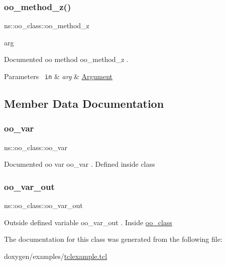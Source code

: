 \subsubsection{\texorpdfstring{oo\_method\_z()}{oo\_method\_z()}}
{\footnotesize\ttfamily ns\+::oo\+\_\+class\+::oo\+\_\+method\+\_\+z\begin{DoxyParamCaption}\item[{}]{arg  }\end{DoxyParamCaption}}

Documented oo method {\ttfamily oo\+\_\+method\+\_\+z} . 
\begin{DoxyParams}[1]{Parameters}
\mbox{\texttt{ in}}  & {\em arg} & \mbox{\hyperlink{struct_argument}{Argument}} \\
\hline
\end{DoxyParams}


\subsection{Member Data Documentation}
\mbox{\label{classns_1_1oo__class_a741f11f4a2db3876205658d4a9a279ba}} 
\subsubsection{\texorpdfstring{oo\_var}{oo\_var}}
{\footnotesize\ttfamily ns\+::oo\+\_\+class\+::oo\+\_\+var\hspace{0.3cm}{\ttfamily [static]}}

Documented oo var {\ttfamily oo\+\_\+var} . Defined inside class \mbox{\label{classns_1_1oo__class_af46293ede16067c38ca2901416cad8ee}} 
\subsubsection{\texorpdfstring{oo\_var\_out}{oo\_var\_out}}
{\footnotesize\ttfamily ns\+::oo\+\_\+class\+::oo\+\_\+var\+\_\+out\hspace{0.3cm}{\ttfamily [static]}}

Outside defined variable {\ttfamily oo\+\_\+var\+\_\+out} . Inside \mbox{\hyperlink{classns_1_1oo__class}{oo\+\_\+class}} 

The documentation for this class was generated from the following file\+:\begin{DoxyCompactItemize}
\item 
doxygen/examples/\mbox{\hyperlink{tclexample_8tcl}{tclexample.\+tcl}}\end{DoxyCompactItemize}

